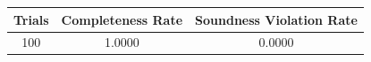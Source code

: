 \begin{tabular}{ccc}
\hline
Trials & Completeness Rate & Soundness Violation Rate \\
\hline
100 & 1.0000 & 0.0000 \\
\hline
\end{tabular}
